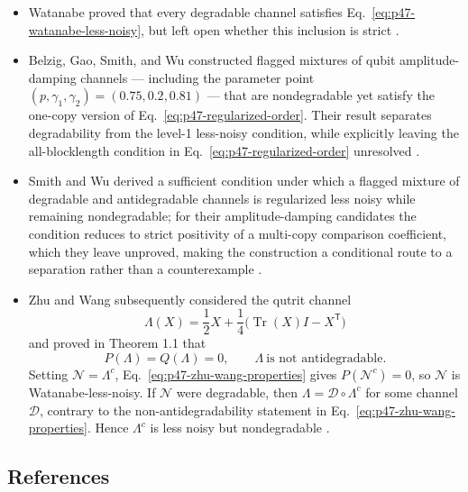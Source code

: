 \begin{itemize}
  \item Watanabe proved that every degradable channel satisfies
  Eq.~\eqref{eq:p47-watanabe-less-noisy}, but left open whether this inclusion
  is strict .

  \item Belzig, Gao, Smith, and Wu constructed flagged mixtures of qubit amplitude-damping channels ---
  including the parameter point $(p,\gamma_1,\gamma_2)=(0.75,0.2,0.81)$ ---
  that are nondegradable yet satisfy the one-copy version of
  Eq.~\eqref{eq:p47-regularized-order}.  Their result
  separates degradability from the level-1 less-noisy condition, while
  explicitly leaving the all-blocklength condition in
  Eq.~\eqref{eq:p47-regularized-order} unresolved
  .

  \item Smith and Wu derived a sufficient condition under which a flagged mixture of degradable and antidegradable channels is regularized less noisy while remaining nondegradable; for their amplitude-damping candidates the condition reduces to strict positivity of a multi-copy comparison coefficient, which they leave unproved, making the construction a conditional route to a separation rather than a counterexample .

  \item Zhu and Wang subsequently considered the qutrit channel
  \begin{equation}
    \Lambda(X)
    =\frac12X+\frac14\bigl(\operatorname{Tr}(X)I-X^{\mathsf T}\bigr)
    \label{eq:p47-zhu-wang-channel}
  \end{equation}
  and proved in Theorem 1.1 that
  \begin{equation}
    P(\Lambda)=Q(\Lambda)=0,
    \qquad
    \Lambda\ \text{is not antidegradable}.
    \label{eq:p47-zhu-wang-properties}
  \end{equation}
  Setting $\mathcal N=\Lambda^c$, Eq.~\eqref{eq:p47-zhu-wang-properties}
  gives $P(\mathcal N^c)=0$, so $\mathcal N$ is Watanabe-less-noisy.  If
  $\mathcal N$ were degradable, then
  $\Lambda=\mathcal D\circ\Lambda^c$ for some channel $\mathcal D$, contrary
  to the non-antidegradability statement in
  Eq.~\eqref{eq:p47-zhu-wang-properties}.  Hence $\Lambda^c$ is less noisy but
  nondegradable .
\end{itemize}

\subsection*{References}

